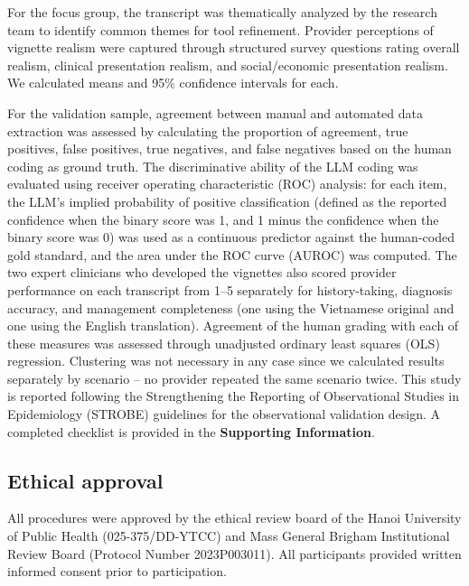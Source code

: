 \documentclass{article}
\begin{document}
For the focus group, the transcript was thematically analyzed by the research team to identify common themes for tool refinement. Provider perceptions of vignette realism were captured through structured survey questions rating overall realism, clinical presentation realism, and social/economic presentation realism. We calculated means and 95\% confidence intervals for each.

For the validation sample, agreement between manual and automated data extraction was assessed by calculating the proportion of agreement, true positives, false positives, true negatives, and false negatives based on the human coding as ground truth. The discriminative ability of the LLM coding was evaluated using receiver operating characteristic (ROC) analysis: for each item, the LLM's implied probability of positive classification (defined as the reported confidence when the binary score was 1, and 1 minus the confidence when the binary score was 0) was used as a continuous predictor against the human-coded gold standard, and the area under the ROC curve (AUROC) was computed. The two expert clinicians who developed the vignettes also scored provider performance on each transcript from 1--5 separately for history-taking, diagnosis accuracy, and management completeness (one using the Vietnamese original and one using the English translation). Agreement of the human grading with each of these measures was assessed through unadjusted ordinary least squares (OLS) regression. Clustering was not necessary in any case since we calculated results separately by scenario -- no provider repeated the same scenario twice. This study is reported following the Strengthening the Reporting of Observational Studies in Epidemiology (STROBE) guidelines for the observational validation design. A completed checklist is provided in the \textbf{Supporting Information}.

\subsection{Ethical approval}

All procedures were approved by the ethical review board of the Hanoi University of Public Health (025-375/DD-YTCC) and Mass General Brigham Institutional Review Board (Protocol Number 2023P003011). All participants provided written informed consent prior to participation.

\end{document}
